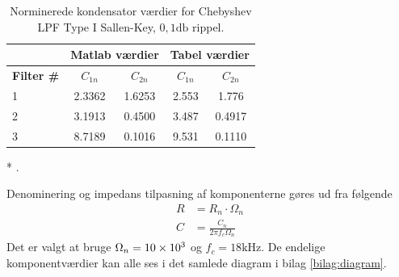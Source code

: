 \begin{table}[h!]
	\centering
	\caption{Norminerede kondensator værdier for Chebyshev LPF Type I Sallen-Key, $0,1\si{\decibel}$ rippel.}
	\label{tab:sallen_key}
	\begin{threeparttable}
		\begin{tabular}{l c c c c}
			\toprule
			& \multicolumn{2}{c}{\textbf{Matlab værdier}} & \multicolumn{2}{c}{\textbf{Tabel værdier\tnote{(*)}}} \\ 
			\midrule
			\textbf{Filter \#} &
			\textbf{$C_{1n}$} 	& 
			\textbf{$C_{2n}$}  	&
			\textbf{$C_{1n}$} 		& 
			\textbf{$C_{2n}$} 	\\
			\midrule
			1 & \num{2.3362} & \num{1.6253} & \num{2.553} & \num{1.776} \\
			2 & \num{3.1913} & \num{0.4500} & \num{3.487} & \num{0.4917} \\
			3 & \num{8.7189} & \num{0.1016} & \num{9.531} & \num{0.1110} \\
			\bottomrule
		\end{tabular}
		
		\begin{tablenotes}
			\item[*] \cite[Table B-2: Chebyshev lowpass Sallen-Key filters, n=6]{sk_data_web}.
		\end{tablenotes}
	\end{threeparttable}
\end{table}

Denominering og impedans tilpasning af komponenterne gøres ud fra følgende
\begin{align}
	R &= R_n \cdot \Omega_n \\
	C &= \frac{C_n}{2\pi f_c \Omega_n} 
\end{align} 
Det er valgt at bruge $\Omega_n = \num{10E3}$ og $f_c = 18\si{\kilo\hertz}$.
De endelige komponentværdier kan alle ses i det samlede diagram i bilag \ref{bilag:diagram}.